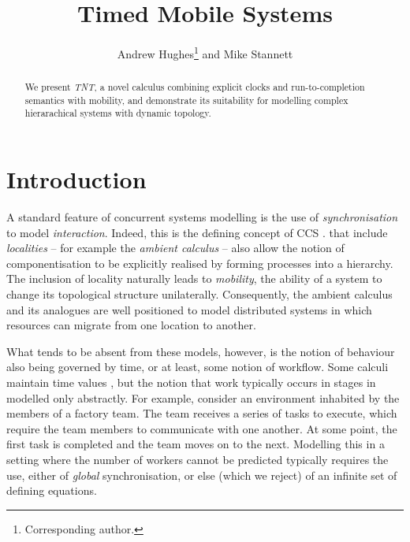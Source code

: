 \documentclass[orivec]{llncs}
\title{Timed Mobile Systems}
\author{Andrew Hughes\thanks{Corresponding author.} and Mike Stannett}
\institute{Department of Computer Science, University of Sheffield, \\
Regent Court, 211 Portobello Street, Sheffield S1 4DP, UK. \\
	   \email{a.hughes@dcs.shef.ac.uk}
}
\begin{document}
\maketitle

\begin{abstract}

We present \emph{TNT}, a novel calculus combining explicit clocks and
run-to-completion semantics with mobility, and demonstrate its
suitability for modelling complex hierarachical systems with dynamic
topology.

\end{abstract}

\section{Introduction}
\label{introduction}

A standard feature of concurrent systems modelling is the use of
\emph{synchronisation} to model \emph{interaction}. Indeed, this is the
defining concept of CCS \cite{milner:ccs}.  that include
\emph{localities} -- for example the \emph{ambient calculus} \cite{amb}
-- also allow the notion of componentisation to be explicitly realised
by forming processes into a hierarchy. The inclusion of locality
naturally leads to \emph{mobility}, the ability of a system to change
its topological structure unilaterally. Consequently, the ambient
calculus and its analogues are well positioned to model distributed
systems in which resources can migrate from one location to another.

What tends to be absent from these models, however, is the notion of
behaviour also being governed by time, or at least, some notion of
workflow. Some calculi maintain  time values
\cite{tccs,beaten:timing,brics:lee}, but the notion that work typically
occurs in stages in modelled only abstractly. For example, consider an
environment inhabited by the members of a factory team. The team
receives a series of tasks to execute, which require the team members to
communicate with one another. At some point, the first task is completed
and the team moves on to the next. Modelling this in a setting where the
number of workers cannot be predicted typically requires the use, either
of \emph{global} synchronisation, or else (which we reject) of an
infinite set of defining equations.
\end{document}
